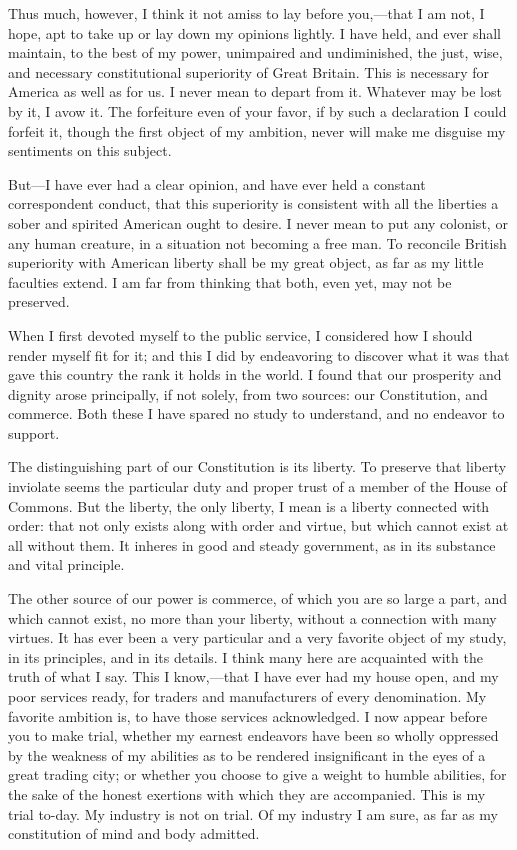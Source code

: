 Thus much, however, I think it not amiss to lay before you,—that I am not, I hope, apt to take up or lay down my opinions lightly. I have held, and ever shall maintain, to the best of my power, unimpaired and undiminished, the just, wise, and necessary constitutional superiority of Great Britain. This is necessary for America as well as for us. I never mean to depart from it. Whatever may be lost by it, I avow it. The forfeiture even of your favor, if by such a declaration I could forfeit it, though the first object of my ambition, never will make me disguise my sentiments on this subject.

But—I have ever had a clear opinion, and have ever held a constant correspondent conduct, that this superiority is consistent with all the liberties a sober and spirited American ought to desire. I never mean to put any colonist, or any human creature, in a situation not becoming a free man. To reconcile British superiority with American liberty shall be my great object, as far as my little faculties extend. I am far from thinking that both, even yet, may not be preserved.

When I first devoted myself to the public service, I considered how I should render myself fit for it; and this I did by endeavoring to discover what it was that gave this country the rank it holds in the world. I found that our prosperity and dignity arose principally, if not solely, from two sources: our Constitution, and commerce. Both these I have spared no study to understand, and no endeavor to support.

The distinguishing part of our Constitution is its liberty. To preserve that liberty inviolate seems the particular duty and proper trust of a member of the House of Commons. But the liberty, the only liberty, I mean is a liberty connected with order: that not only exists along with order and virtue, but which cannot exist at all without them. It inheres in good and steady government, as in its substance and vital principle.

The other source of our power is commerce, of which you are so large a part, and which cannot exist, no more than your liberty, without a connection with many virtues. It has ever been a very particular and a very favorite object of my study, in its principles, and in its details. I think many here are acquainted with the truth of what I say. This I know,—that I have ever had my house open, and my poor services ready, for traders and manufacturers of every denomination. My favorite ambition is, to have those services acknowledged. I now appear before you to make trial, whether my earnest endeavors have been so wholly oppressed by the weakness of my abilities as to be rendered insignificant in the eyes of a great trading city; or whether you choose to give a weight to humble abilities, for the sake of the honest exertions with which they are accompanied. This is my trial to-day. My industry is not on trial. Of my industry I am sure, as far as my constitution of mind and body admitted.

